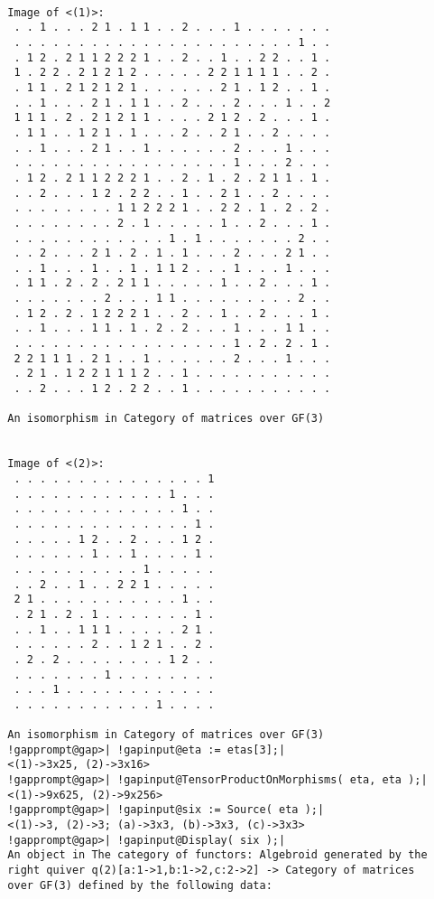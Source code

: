 \documentclass[a4paper,11pt]{report}
\begin{document}
{{{\begin{Verbatim}[commandchars=!@|,fontsize=\small,frame=single,label=Example]
  
  Image of <(1)>:
   . . 1 . . . 2 1 . 1 1 . . 2 . . . 1 . . . . . . .
   . . . . . . . . . . . . . . . . . . . . . . 1 . .
   . 1 2 . 2 1 1 2 2 2 1 . . 2 . . 1 . . 2 2 . . 1 .
   1 . 2 2 . 2 1 2 1 2 . . . . . 2 2 1 1 1 1 . . 2 .
   . 1 1 . 2 1 2 1 2 1 . . . . . . 2 1 . 1 2 . . 1 .
   . . 1 . . . 2 1 . 1 1 . . 2 . . . 2 . . . 1 . . 2
   1 1 1 . 2 . 2 1 2 1 1 . . . . 2 1 2 . 2 . . . 1 .
   . 1 1 . . 1 2 1 . 1 . . . 2 . . 2 1 . . 2 . . . .
   . . 1 . . . 2 1 . . 1 . . . . . . 2 . . . 1 . . .
   . . . . . . . . . . . . . . . . . 1 . . . 2 . . .
   . 1 2 . 2 1 1 2 2 2 1 . . 2 . 1 . 2 . 2 1 1 . 1 .
   . . 2 . . . 1 2 . 2 2 . . 1 . . 2 1 . . 2 . . . .
   . . . . . . . . 1 1 2 2 2 1 . . 2 2 . 1 . 2 . 2 .
   . . . . . . . . 2 . 1 . . . . . 1 . . 2 . . . 1 .
   . . . . . . . . . . . . 1 . 1 . . . . . . . 2 . .
   . . 2 . . . 2 1 . 2 . 1 . 1 . . . 2 . . . 2 1 . .
   . . 1 . . . 1 . . 1 . 1 1 2 . . . 1 . . . 1 . . .
   . 1 1 . 2 . 2 . 2 1 1 . . . . . 1 . . 2 . . . 1 .
   . . . . . . . 2 . . . 1 1 . . . . . . . . . 2 . .
   . 1 2 . 2 . 1 2 2 2 1 . . 2 . . 1 . . 2 . . . 1 .
   . . 1 . . . 1 1 . 1 . 2 . 2 . . . 1 . . . 1 1 . .
   . . . . . . . . . . . . . . . . . 1 . 2 . 2 . 1 .
   2 2 1 1 1 . 2 1 . . 1 . . . . . . 2 . . . 1 . . .
   . 2 1 . 1 2 2 1 1 1 2 . . 1 . . . . . . . . . . .
   . . 2 . . . 1 2 . 2 2 . . 1 . . . . . . . . . . .
  
  An isomorphism in Category of matrices over GF(3)
  
  
  Image of <(2)>:
   . . . . . . . . . . . . . . . 1
   . . . . . . . . . . . . 1 . . .
   . . . . . . . . . . . . . 1 . .
   . . . . . . . . . . . . . . 1 .
   . . . . . 1 2 . . 2 . . . 1 2 .
   . . . . . . 1 . . 1 . . . . 1 .
   . . . . . . . . . . 1 . . . . .
   . . 2 . . 1 . . 2 2 1 . . . . .
   2 1 . . . . . . . . . . . 1 . .
   . 2 1 . 2 . 1 . . . . . . . 1 .
   . . 1 . . 1 1 1 . . . . . 2 1 .
   . . . . . . 2 . . 1 2 1 . . 2 .
   . 2 . 2 . . . . . . . . 1 2 . .
   . . . . . . . 1 . . . . . . . .
   . . . 1 . . . . . . . . . . . .
   . . . . . . . . . . . 1 . . . .
  
  An isomorphism in Category of matrices over GF(3)
  !gapprompt@gap>| !gapinput@eta := etas[3];|
  <(1)->3x25, (2)->3x16>
  !gapprompt@gap>| !gapinput@TensorProductOnMorphisms( eta, eta );|
  <(1)->9x625, (2)->9x256>
  !gapprompt@gap>| !gapinput@six := Source( eta );|
  <(1)->3, (2)->3; (a)->3x3, (b)->3x3, (c)->3x3>
  !gapprompt@gap>| !gapinput@Display( six );|
  An object in The category of functors: Algebroid generated by the
  right quiver q(2)[a:1->1,b:1->2,c:2->2] -> Category of matrices
  over GF(3) defined by the following data:
  

\end{Verbatim}}}}
\end{document}
